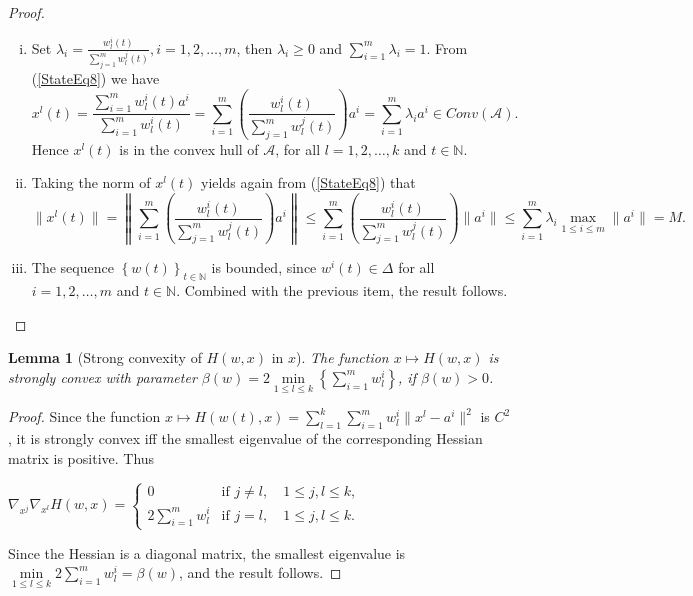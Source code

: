 \documentclass[11pt]{article}
\numberwithin{equation}{section}
\newtheorem{lemma}{Lemma}[proposition]
\begin{document}
\begin{proof}
\begin{enumerate}[(i)]
	\item  Set $\lambda_i = \frac{ w^i_l(t)}{\sum_{j=1}^{m} w^j_l(t)}, i=1, 2, \ldots ,m$, then $\lambda_i \geq 0$ and $\sum\limits_{i=1}^{m} \lambda_i = 1$. From (\ref{StateEq8}) we have
	\begin{equation*}
		x^l(t) = \frac{\sum_{i=1}^{m} w^i_l(t) a^i}{\sum_{i=1}^{m} w^i_l(t)} 
		= \sum_{i=1}^{m} \left( \frac{ w^i_l(t)}{\sum_{j=1}^{m} w^j_l(t)} \right) a^i 
		= \sum\limits_{i=1}^{m} \lambda_i a^i \in Conv(\mathcal{A}).
	\end{equation*}
	Hence $x^l(t)$ is in the convex hull of $\mathcal{A}$, for all $l = 1, 2, \ldots, k$ and $t \in \mathbb{N}$.

	\item
	Taking the norm of $x^l(t)$ yields again from (\ref{StateEq8}) that
	\begin{equation*}
		\| x^l(t) \| = \left\lVert \sum_{i=1}^{m} \left( \frac{ w^i_l(t)}{\sum_{j=1}^{m} w^j_l(t)} \right) a^i \right\lVert
		\leq \sum_{i=1}^{m} \left( \frac{ w^i_l(t)}{\sum_{j=1}^{m} w^j_l(t)} \right) \| a^i \|
		\leq \sum_{i=1}^{m} \lambda_i \max\limits_{1 \leq i \leq m} \| a^i \| = M .
	\end{equation*}
	\item The sequence $\left\lbrace w(t) \right\rbrace_{t \in \mathbb{N}}$ is bounded, since $w^i(t) \in \Delta$ for all $i=1, 2, \ldots ,m$ and $t \in \mathbb{N}$. Combined with the previous item, the result follows.
\end{enumerate} 
\end{proof}

\begin{lemma}[Strong convexity of $H(w,x)$ in $x$] \label{StateEq14}
The function $x \mapsto H(w,x)$ is strongly convex with parameter $\beta(w) = 2 \min\limits_{1 \leq l \leq k} \left\lbrace \sum\limits_{i=1}^{m} w^i_l\right \rbrace$, if $\beta(w) > 0$.
\end{lemma}

\begin{proof}
Since the function $x \mapsto H(w(t),x) = 
\sum\limits_{l=1}^{k} \sum\limits_{i=1}^{m} w^i_l \|x^l - a^i\|^2$ is $C^2$, it is strongly convex iff the smallest eigenvalue of the corresponding Hessian matrix is positive. Thus

\begin{center}
$\nabla_{x^j} \nabla_{x^l} H(w,x) = 
\begin{cases} 0 &\mbox{if } j \neq l, \quad 1 \leq j,l \leq k ,
\\ 2\sum\limits_{i=1}^{m} w^i_l &\mbox{if } j = l, \quad 1 \leq j,l \leq k. \end{cases} $
\end{center}

Since the Hessian is a diagonal matrix, the smallest eigenvalue is $\min\limits_{1 \leq l \leq k} 2\sum\limits_{i=1}^{m} w^i_l = \beta(w)$, and the result follows.
\end{proof}
\end{document}
